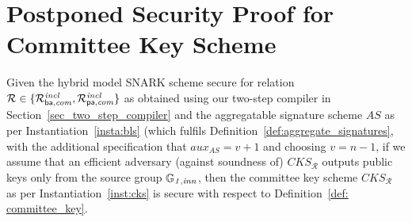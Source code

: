 \section{Postponed Security Proof for Committee Key Scheme}
\label{supplementary_proof_sec_cks}

\begin{theorem} Given the hybrid model SNARK scheme secure for relation $\mathcal{R} \in \{ \mathcal{R}^{\mathit{incl}}_{\mathsf{ba},\mathit{com}}, \mathcal{R}^{\mathit{incl}}_{\mathsf{pa},\mathit{com}}\}$ as 
obtained using our two-step compiler in Section~\ref{sec_two_step_compiler} and the aggregatable signature scheme $\mathit{AS}$ 
                     as per Instantiation~\ref{insta:bls} (which fulfils Definition~\ref{def:aggregate_signatures}, with the additional 
                     specification that $\mathit{aux}_{\mathit{AS}} = v+1$ and choosing $v = n-1$, 
if we assume that an efficient adversary (against soundness of) $\mathit{CKS}_{\mathcal{R}}$ outputs public keys only from the source group $\mathbb{G}_{\mathit{1,inn}}$,  
then the committee key scheme $\mathit{CKS}_{\mathcal{R}}$ as per Instantiation~\ref{inst:cks} is secure with respect to Definition~\ref{def: committee_key}. 
\end{theorem}

